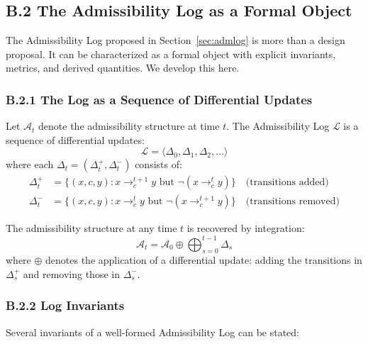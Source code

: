 \documentclass[12pt, a4paper]{article}
\theoremstyle{plain}
\theoremstyle{definition}
\theoremstyle{remark}
\begin{document}
\subsection*{B.2 The Admissibility Log as a Formal Object}

The Admissibility Log proposed in Section~\ref{sec:admlog} is more than a
design proposal. It can be characterized as a formal object with explicit
invariants, metrics, and derived quantities. We develop this here.

\subsubsection*{B.2.1 The Log as a Sequence of Differential Updates}

Let $\mathcal{A}_t$ denote the admissibility structure at time $t$. The
Admissibility Log $\mathcal{L}$ is a sequence of differential updates:
$$\mathcal{L} = \langle \Delta_0, \Delta_1, \Delta_2, \ldots \rangle$$
where each $\Delta_t = (\Delta_t^+, \Delta_t^-)$ consists of:
\begin{align}
\Delta_t^+ &= \{(x, c, y) : x \to_{c}^{t+1} y \text{ but } \neg(x \to_c^t y)\}
\quad\text{(transitions added)} \\
\Delta_t^- &= \{(x, c, y) : x \to_c^t y \text{ but } \neg(x \to_c^{t+1} y)\}
\quad\text{(transitions removed)}
\end{align}

The admissibility structure at any time $t$ is recovered by integration:
$$\mathcal{A}_t = \mathcal{A}_0 \oplus \bigoplus_{s=0}^{t-1} \Delta_s$$
where $\oplus$ denotes the application of a differential update: adding the
transitions in $\Delta_s^+$ and removing those in $\Delta_s^-$.

\subsubsection*{B.2.2 Log Invariants}

Several invariants of a well-formed Admissibility Log can be stated:
\end{document}
